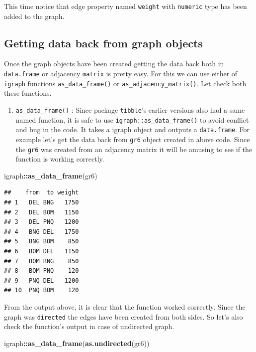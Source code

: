 \documentclass[
]{book}
\newenvironment{Shaded}{\begin{snugshade}}{\end{snugshade}}
\newcommand{\FunctionTok}[1]{\textcolor[rgb]{0.13,0.29,0.53}{\textbf{#1}}}
\newcommand{\NormalTok}[1]{#1}
\newcommand{\SpecialCharTok}[1]{\textcolor[rgb]{0.81,0.36,0.00}{\textbf{#1}}}
\providecommand{\tightlist}{%
  \setlength{\itemsep}{0pt}\setlength{\parskip}{0pt}}
\begin{document}
This time notice that edge property named \texttt{weight} with \texttt{numeric} type has been added to the graph.

\hypertarget{getting-data-back-from-graph-objects}{%
\subsection{Getting data back from graph objects}\label{getting-data-back-from-graph-objects}}

Once the graph objects have been created getting the data back both in \texttt{data.frame} or adjacency \texttt{matrix} is pretty easy. For this we can use either of \texttt{igraph} functions \texttt{as\_data\_frame()} or \texttt{as\_adjacency\_matrix()}. Let check both these functions.

\begin{enumerate}
\def\labelenumi{\arabic{enumi}.}
\tightlist
\item
  \texttt{as\_data\_frame()} : Since package \texttt{tibble}'s earlier versions also had a same named function, it is safe to use \texttt{igraph::as\_data\_frame()} to avoid conflict and bug in the code. It takes a igraph object and outputs a \texttt{data.frame}. For example let's get the data back from \texttt{gr6} object created in above code. Since the \texttt{gr6} was created from an adjacency matrix it will be amusing to see if the function is working correctly.
\end{enumerate}

\begin{Shaded}
\begin{Highlighting}[]
\NormalTok{igraph}\SpecialCharTok{::}\FunctionTok{as\_data\_frame}\NormalTok{(gr6)}
\end{Highlighting}
\end{Shaded}

\begin{verbatim}
##    from  to weight
## 1   DEL BNG   1750
## 2   DEL BOM   1150
## 3   DEL PNQ   1200
## 4   BNG DEL   1750
## 5   BNG BOM    850
## 6   BOM DEL   1150
## 7   BOM BNG    850
## 8   BOM PNQ    120
## 9   PNQ DEL   1200
## 10  PNQ BOM    120
\end{verbatim}

From the output above, it is clear that the function worked correctly. Since the graph was \texttt{directed} the edges have been created from both sides. So let's also check the function's output in case of undirected graph.

\begin{Shaded}
\begin{Highlighting}[]
\NormalTok{igraph}\SpecialCharTok{::}\FunctionTok{as\_data\_frame}\NormalTok{(}\FunctionTok{as.undirected}\NormalTok{(gr6))}
\end{Highlighting}
\end{Shaded}
\end{document}
